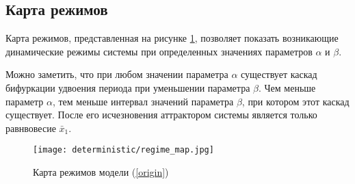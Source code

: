 \subsection{Карта режимов}

    Карта режимов, представленная на рисунке \ref{regimeMap}, позволяет показать возникающие динамические режимы системы при определенных значениях параметров \(\alpha\) и \(\beta\).

    Можно заметить, что при любом значении параметра \(\alpha\) существует каскад бифуркации удвоения периода при уменьшении параметра \(\beta\). Чем меньше параметр \(\alpha\), тем меньше интервал значений параметра \(\beta\), при котором этот каскад существует. После его исчезновения аттрактором системы является только равнвовесие \(\bar{x}_1\).

    \begin{figure}
        \centering
        \texttt{[image: deterministic/regime\_map.jpg]}

        \captionsetup{justification=centering}
        \caption{Карта режимов модели (\ref{origin})}
        \label{regimeMap}
    \end{figure}
